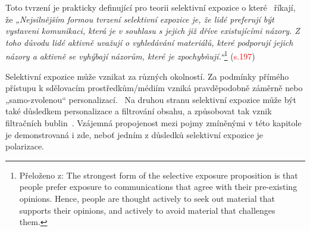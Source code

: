     Toto tvrzení je prakticky definující pro teorii selektivní expozice o které~\cite {FreedmanSears} říkají, že \textit{„Nejsilnějším formou tvrzení selektivní expozice je, že lidé preferují být vystaveni komunikaci, která je v souhlasu s jejich již dříve existujícími názory. Z toho důvodu lidé aktivně uvažují o vyhledávání materiálů, které podporují jejich názory a aktivně se vyhýbají názorům, které je zpochybňují.“}\footnote{Přeloženo z: The strongest form of the selective exposure proposition is that people prefer exposure to communications that agree with their pre-existing opinions. Hence, people are thought actively to seek out material that supports their opinions, and actively to avoid material that challenges them.} (\textcolor{red}{s.197}) 
    
    Selektivní expozice může vznikat za různých okolností. Za podmínky přímého přístupu k sdělovacím prostředkům/médiím vzniká pravděpodobně záměrně nebo „samo-zvolenou“ personalizací.~\citep{cardenal} Na druhou stranu selektivní expozice může být také důsledkem personalizace a filtrování obsahu, a způsobovat tak vznik filtračních bublin~\citep{Pariser2011}. Vzájemná propojenost mezi pojmy zmíněnými v této kapitole je demonstrovaná i zde, neboť jedním z důsledků selektivní expozice je polarizace.~\citep{ZuiderveenBorgesius2016Should}